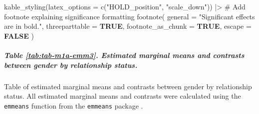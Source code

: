 \documentclass[
  bookmarksnumbered]{article}
\newenvironment{Shaded}{\begin{snugshade}}{\end{snugshade}}
\newcommand{\AttributeTok}[1]{\textcolor[rgb]{0.80,0.80,0.80}{#1}}
\newcommand{\CommentTok}[1]{\textcolor[rgb]{0.50,0.62,0.50}{#1}}
\newcommand{\ConstantTok}[1]{\textcolor[rgb]{0.86,0.64,0.64}{\textbf{#1}}}
\newcommand{\FunctionTok}[1]{\textcolor[rgb]{0.94,0.94,0.56}{#1}}
\newcommand{\NormalTok}[1]{\textcolor[rgb]{0.80,0.80,0.80}{#1}}
\newcommand{\SpecialCharTok}[1]{\textcolor[rgb]{0.86,0.64,0.64}{#1}}
\newcommand{\StringTok}[1]{\textcolor[rgb]{0.80,0.58,0.58}{#1}}
\begin{document}
\begin{Shaded}
\begin{Highlighting}[]
  \FunctionTok{kable\_styling}\NormalTok{(}\AttributeTok{latex\_options =} \FunctionTok{c}\NormalTok{(}\StringTok{"HOLD\_position"}\NormalTok{, }\StringTok{"scale\_down"}\NormalTok{)) }\SpecialCharTok{|\textgreater{}}
  \CommentTok{\# Add footnote explaining significance formatting}
  \FunctionTok{footnote}\NormalTok{(}
    \AttributeTok{general =} \StringTok{"Significant effects are in bold."}\NormalTok{, }\AttributeTok{threeparttable =} \ConstantTok{TRUE}\NormalTok{,}
    \AttributeTok{footnote\_as\_chunk =} \ConstantTok{TRUE}\NormalTok{, }\AttributeTok{escape =} \ConstantTok{FALSE}
\NormalTok{  )}
\end{Highlighting}
\end{Shaded}

\begin{table}[H]
\centering
\caption{\label{tab:tab-m1a-emm2}Estimated marginal means and contrasts between relationship status}
\centering
{}
\end{table}

\subparagraph{Table \ref{tab:tab-m1a-emm3}. Estimated marginal means and contrasts between gender by relationship status.}\label{table-reftabtab-m1a-emm3.-estimated-marginal-means-and-contrasts-between-gender-by-relationship-status.}

Table of estimated marginal means and contrasts between gender by relationship status. All estimated marginal means and contrasts were calculated using the \texttt{emmeans} function from the \texttt{emmeans} package \autocite{emmeanscit}.
\end{document}
